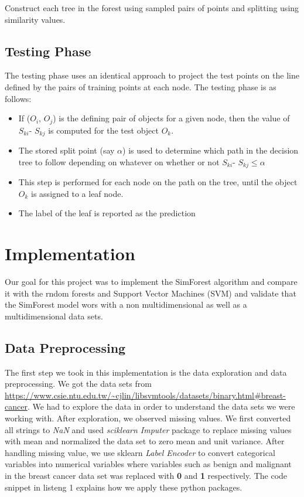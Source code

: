 \documentclass{article}
\begin{document}
\noindent Construct each tree in the forest using sampled pairs of points and splitting using similarity values.


\subsection{Testing Phase}
The testing phase uses an identical approach to project the test points on the line defined by the pairs of training points at each node. The testing phase is as follows:

\begin{itemize}
\item If ($O_i$, $O_j$) is the defining pair of objects for a given node, then the value of $S_{ki}$- $S_{kj}$ is computed for the test object $O_k$.
\item The stored split point (say $\alpha$) is used to determine which path in the decision tree to follow depending on whatever on whether or not $S_{ki}$- $S_{kj} \leq  \alpha$ 
\item This step is performed for each node on the path on the tree, until the object $O_k$ is assigned to a leaf node.
\item The label of the leaf is reported as the prediction
\end{itemize}
\section{Implementation}
Our goal for this project was to implement the SimForest algorithm and compare it with the rndom forests and Support Vector Machines (SVM) and validate that the SimForest model wors with a non multidimensional as well as a multidimensional data sets.\\
\subsection{Data Preprocessing}
The first step we took in this implementation is the data exploration and data preprocessing. We got the data sets from \url{https://www.csie.ntu.edu.tw/~cjlin/libsvmtools/datasets/binary.html#breast-cancer}. We had to explore the data in order to understand the data sets we were working with. After exploration, we observed missing values. We first converted all strings to \textit{NaN} and used \textit{sciklearn Imputer} package to replace missing values with mean and normalized the data set to zero mean and unit variance. After handling missing value, we use sklearn \textit{Label Encoder} to convert categorical variables into numerical variables where variables such as benign and malignant in the breast cancer data set was replaced with \textbf{0}  and \textbf{1}  respectively. The code snippet in listeng 1 explains how we apply these python packages.
\end{document}
